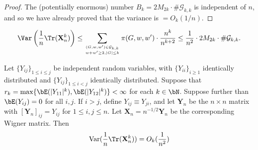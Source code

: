 \begin{proof}
  \notready
  The (potentially enormous) number $B_k=2M_{2k}\cdot\#\mathcal{G}_{k,k}$ is independent of $n$, and so we have already proved that the variance is $=O_k(1/n)$.
\end{proof}


\begin{lemma}
    \label{lem:elimination_kp1}
    \notready

    \[ \Var\left( \frac1n\Tr(\mathbf{X}_n^k)\right) \le \sum_{(G,w,w')\in\mathcal{G}_{k,k}\atop w+w'\ge 2, |G| \leq k} \pi(G,w,w')\cdot \frac{n^{k}}{n^{k+2}} \le \frac{1}{n^2}\cdot 2M_{2k}\cdot \#\mathcal{G}_{k,k}. \]
\end{lemma}


\begin{proposition}
  \label{prop:matrix_moments_convergence_probability}
  \notready
  Let $\{Y_{ij}\}_{1 \leq i \leq j}$ be independent random variables, with $\{Y_{ii}\}_{i\geq 1}$ identically distributed and $\{Y_{ij}\}_{1 \leq i < j}$ identically distributed. Suppose that $r_k = \max\{\bE(|Y_{11}|^k),\bE(|Y_{12}|^k)\} < \infty$ for each $k\in\bN$. Suppose further than $\bE(Y_{ij})=0$ for all $i,j$. If $i>j$, define $Y_{ij} \equiv Y_{ji}$, and let $\mathbf{Y}_n$ be the $n\times n$ matrix with $[\mathbf{Y}_n]_{ij} = Y_{ij}$ for $1\le i,j\le n$. Let $\mathbf{X}_n = n^{-1/2}\mathbf{Y}_n$ be the corresponding Wigner matrix. Then
  $$
  \operatorname{Var}(\frac{1}{n}\Tr(\mathbf{X}_{n}^{k})) = O_{k}(\frac{1}{n^2})
  $$
\end{proposition}


%









